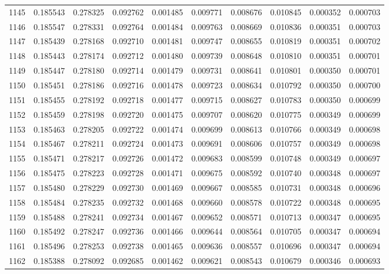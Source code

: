 \begin{tabular}{lrrrrrrrrr}
1145 & 0.185543 & 0.278325 & 0.092762 & 0.001485 & 0.009771 & 0.008676 & 0.010845 & 0.000352 & 0.000703 \\
1146 & 0.185547 & 0.278331 & 0.092764 & 0.001484 & 0.009763 & 0.008669 & 0.010836 & 0.000351 & 0.000703 \\
1147 & 0.185439 & 0.278168 & 0.092710 & 0.001481 & 0.009747 & 0.008655 & 0.010819 & 0.000351 & 0.000702 \\
1148 & 0.185443 & 0.278174 & 0.092712 & 0.001480 & 0.009739 & 0.008648 & 0.010810 & 0.000351 & 0.000701 \\
1149 & 0.185447 & 0.278180 & 0.092714 & 0.001479 & 0.009731 & 0.008641 & 0.010801 & 0.000350 & 0.000701 \\
1150 & 0.185451 & 0.278186 & 0.092716 & 0.001478 & 0.009723 & 0.008634 & 0.010792 & 0.000350 & 0.000700 \\
1151 & 0.185455 & 0.278192 & 0.092718 & 0.001477 & 0.009715 & 0.008627 & 0.010783 & 0.000350 & 0.000699 \\
1152 & 0.185459 & 0.278198 & 0.092720 & 0.001475 & 0.009707 & 0.008620 & 0.010775 & 0.000349 & 0.000699 \\
1153 & 0.185463 & 0.278205 & 0.092722 & 0.001474 & 0.009699 & 0.008613 & 0.010766 & 0.000349 & 0.000698 \\
1154 & 0.185467 & 0.278211 & 0.092724 & 0.001473 & 0.009691 & 0.008606 & 0.010757 & 0.000349 & 0.000698 \\
1155 & 0.185471 & 0.278217 & 0.092726 & 0.001472 & 0.009683 & 0.008599 & 0.010748 & 0.000349 & 0.000697 \\
1156 & 0.185475 & 0.278223 & 0.092728 & 0.001471 & 0.009675 & 0.008592 & 0.010740 & 0.000348 & 0.000697 \\
1157 & 0.185480 & 0.278229 & 0.092730 & 0.001469 & 0.009667 & 0.008585 & 0.010731 & 0.000348 & 0.000696 \\
1158 & 0.185484 & 0.278235 & 0.092732 & 0.001468 & 0.009660 & 0.008578 & 0.010722 & 0.000348 & 0.000695 \\
1159 & 0.185488 & 0.278241 & 0.092734 & 0.001467 & 0.009652 & 0.008571 & 0.010713 & 0.000347 & 0.000695 \\
1160 & 0.185492 & 0.278247 & 0.092736 & 0.001466 & 0.009644 & 0.008564 & 0.010705 & 0.000347 & 0.000694 \\
1161 & 0.185496 & 0.278253 & 0.092738 & 0.001465 & 0.009636 & 0.008557 & 0.010696 & 0.000347 & 0.000694 \\
1162 & 0.185388 & 0.278092 & 0.092685 & 0.001462 & 0.009621 & 0.008543 & 0.010679 & 0.000346 & 0.000693 \\

\end{tabular}
